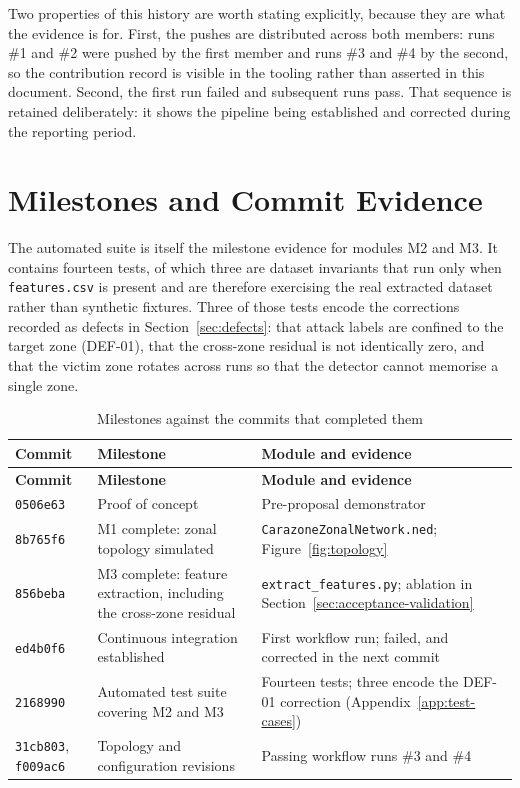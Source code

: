 Two properties of this history are worth stating explicitly, because they are what
the evidence is for. First, the pushes are distributed across both members:
runs \#1 and \#2 were pushed by the first member and runs \#3 and \#4 by the
second, so the contribution record is visible in the tooling rather than asserted in
this document. Second, the first run failed and subsequent runs pass. That sequence
is retained deliberately: it shows the pipeline being established and corrected during
the reporting period.

\section{Milestones and Commit Evidence}
The automated suite is itself the milestone evidence for modules M2 and M3. It
contains fourteen tests, of which three are dataset invariants that run only when
\texttt{features.csv} is present and are therefore exercising the real extracted
dataset rather than synthetic fixtures. Three of those tests encode the corrections
recorded as defects in Section~\ref{sec:defects}: that attack labels are confined to the target
zone (DEF-01), that the cross-zone residual is not identically zero, and that the
victim zone rotates across runs so that the detector cannot memorise a single zone.

\begin{longtable}{p{} p{} p{}}
\caption{Milestones against the commits that completed them}\label{tab:milestones}\\
\toprule
\textbf{Commit} & \textbf{Milestone} & \textbf{Module and evidence} \\
\midrule
\endfirsthead
\toprule
\textbf{Commit} & \textbf{Milestone} & \textbf{Module and evidence} \\
\midrule
\endhead
\texttt{0506e63} & Proof of concept & Pre-proposal demonstrator \\
\addlinespace
\texttt{8b765f6} & M1 complete: zonal topology simulated &
\texttt{CarazoneZonalNetwork.ned}; Figure~\ref{fig:topology} \\
\addlinespace
\texttt{856beba} & M3 complete: feature extraction, including the cross-zone residual &
\texttt{extract\_features.py}; ablation in Section~\ref{sec:acceptance-validation} \\
\addlinespace
\texttt{ed4b0f6} & Continuous integration established &
First workflow run; failed, and corrected in the next commit \\
\addlinespace
\texttt{2168990} & Automated test suite covering M2 and M3 &
Fourteen tests; three encode the DEF-01 correction (Appendix~\ref{app:test-cases}) \\
\addlinespace
\texttt{31cb803}, \texttt{f009ac6} & Topology and configuration revisions &
Passing workflow runs \#3 and \#4 \\
\bottomrule
\end{longtable}

